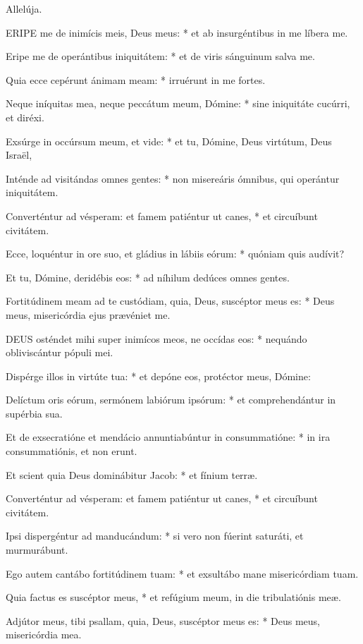   Allelúja.


\lettrine[lines=2]{E}{RIPE} me de inimícis meis, Deus meus: * et ab insurgéntibus in me líbera me.

Eripe me de operántibus iniquitátem: * et de viris sánguinum salva me.

Quia ecce cepérunt ánimam meam: * irruérunt in me fortes.

Neque iníquitas mea, neque peccátum meum, Dómine: * sine iniquitáte cucúrri, et diréxi.

Exsúrge in occúrsum meum, et vide: * et tu, Dómine, Deus virtútum, Deus Israël,

Inténde ad visitándas omnes gentes: * non misereáris ómnibus, qui operántur iniquitátem.

Converténtur ad vésperam: et famem patiéntur ut canes, * et circuíbunt civitátem.

Ecce, loquéntur in ore suo, et gládius in lábiis eórum: * quóniam quis audívit?

Et tu, Dómine, deridébis eos: * ad níhilum dedúces omnes gentes.

Fortitúdinem meam ad te custódiam, quia, Deus, suscéptor meus es: * Deus meus, misericórdia ejus prævéniet me.


\lettrine[lines=2]{D}{EUS} osténdet mihi super inimícos meos, ne occídas eos: * nequándo obliviscántur pópuli mei.

Dispérge illos in virtúte tua: * et depóne eos, protéctor meus, Dómine:

Delíctum oris eórum, sermónem labiórum ipsórum: * et comprehendántur in supérbia sua.

Et de exsecratióne et mendácio annuntiabúntur in consummatióne: * in ira consummatiónis, et non erunt.

Et scient quia Deus dominábitur Jacob: * et fínium terræ.

Converténtur ad vésperam: et famem patiéntur ut canes, * et circuíbunt civitátem.

Ipsi dispergéntur ad manducándum: * si vero non fúerint saturáti, et murmurábunt.

Ego autem cantábo fortitúdinem tuam: * et exsultábo mane misericórdiam tuam.

Quia factus es suscéptor meus, * et refúgium meum, in die tribulatiónis meæ.

Adjútor meus, tibi psallam, quia, Deus, suscéptor meus es: * Deus meus, misericórdia mea.


